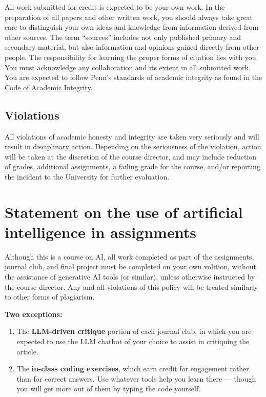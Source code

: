 \documentclass[11pt]{article}
\begin{document}
All work submitted for credit is expected to be your own work. In the preparation of all papers
and other written work, you should always take great care to distinguish your own ideas and
knowledge from information derived from other sources. The term ``sources'' includes not only
published primary and secondary material, but also information and opinions gained directly from
other people. The responsibility for learning the proper forms of citation lies with you. You
must acknowledge any collaboration and its extent in all submitted work. You are expected to
follow Penn's standards of academic integrity as found in the
\href{https://catalog.upenn.edu/pennbook/code-of-academic-integrity}{Code of Academic Integrity}.

\subsection{Violations}

All violations of academic honesty and integrity are taken very seriously and will result in
disciplinary action. Depending on the seriousness of the violation, action will be taken at the
discretion of the course director, and may include reduction of grades, additional assignments, a
failing grade for the course, and/or reporting the incident to the University for further
evaluation.

\section{Statement on the use of artificial intelligence in assignments}

Although this is a course on AI, all work completed as part of the assignments, journal club, and
final project must be completed on your own volition, without the assistance of generative AI
tools (or similar), unless otherwise instructed by the course director. Any and all violations of
this policy will be treated similarly to other forms of plagiarism.

\textbf{Two exceptions:}

\begin{enumerate}
  \item The \textbf{LLM-driven critique} portion of each journal club, in which you are expected
        to use the LLM chatbot of your choice to assist in critiquing the article.
  \item The \textbf{in-class coding exercises}, which earn credit for engagement rather than for
        correct answers. Use whatever tools help you learn there --- though you will get more out
        of them by typing the code yourself.
\end{enumerate}
\end{document}
